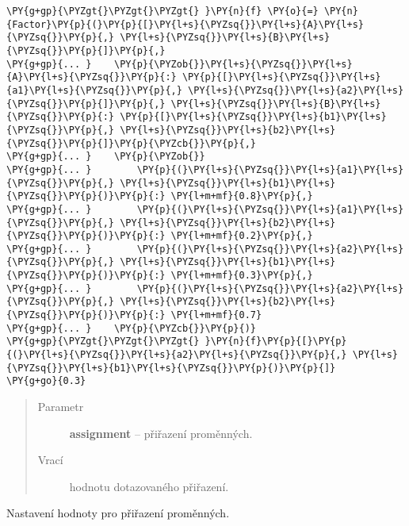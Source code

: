 \begin{fulllineitems}
\begin{fulllineitems}
\begin{Verbatim}[commandchars=\\\{\}]
\PY{g+gp}{\PYZgt{}\PYZgt{}\PYZgt{} }\PY{n}{f} \PY{o}{=} \PY{n}{Factor}\PY{p}{(}\PY{p}{[}\PY{l+s}{\PYZsq{}}\PY{l+s}{A}\PY{l+s}{\PYZsq{}}\PY{p}{,} \PY{l+s}{\PYZsq{}}\PY{l+s}{B}\PY{l+s}{\PYZsq{}}\PY{p}{]}\PY{p}{,}
\PY{g+gp}{... }    \PY{p}{\PYZob{}}\PY{l+s}{\PYZsq{}}\PY{l+s}{A}\PY{l+s}{\PYZsq{}}\PY{p}{:} \PY{p}{[}\PY{l+s}{\PYZsq{}}\PY{l+s}{a1}\PY{l+s}{\PYZsq{}}\PY{p}{,} \PY{l+s}{\PYZsq{}}\PY{l+s}{a2}\PY{l+s}{\PYZsq{}}\PY{p}{]}\PY{p}{,} \PY{l+s}{\PYZsq{}}\PY{l+s}{B}\PY{l+s}{\PYZsq{}}\PY{p}{:} \PY{p}{[}\PY{l+s}{\PYZsq{}}\PY{l+s}{b1}\PY{l+s}{\PYZsq{}}\PY{p}{,} \PY{l+s}{\PYZsq{}}\PY{l+s}{b2}\PY{l+s}{\PYZsq{}}\PY{p}{]}\PY{p}{\PYZcb{}}\PY{p}{,}
\PY{g+gp}{... }    \PY{p}{\PYZob{}}
\PY{g+gp}{... }        \PY{p}{(}\PY{l+s}{\PYZsq{}}\PY{l+s}{a1}\PY{l+s}{\PYZsq{}}\PY{p}{,} \PY{l+s}{\PYZsq{}}\PY{l+s}{b1}\PY{l+s}{\PYZsq{}}\PY{p}{)}\PY{p}{:} \PY{l+m+mf}{0.8}\PY{p}{,}
\PY{g+gp}{... }        \PY{p}{(}\PY{l+s}{\PYZsq{}}\PY{l+s}{a1}\PY{l+s}{\PYZsq{}}\PY{p}{,} \PY{l+s}{\PYZsq{}}\PY{l+s}{b2}\PY{l+s}{\PYZsq{}}\PY{p}{)}\PY{p}{:} \PY{l+m+mf}{0.2}\PY{p}{,}
\PY{g+gp}{... }        \PY{p}{(}\PY{l+s}{\PYZsq{}}\PY{l+s}{a2}\PY{l+s}{\PYZsq{}}\PY{p}{,} \PY{l+s}{\PYZsq{}}\PY{l+s}{b1}\PY{l+s}{\PYZsq{}}\PY{p}{)}\PY{p}{:} \PY{l+m+mf}{0.3}\PY{p}{,}
\PY{g+gp}{... }        \PY{p}{(}\PY{l+s}{\PYZsq{}}\PY{l+s}{a2}\PY{l+s}{\PYZsq{}}\PY{p}{,} \PY{l+s}{\PYZsq{}}\PY{l+s}{b2}\PY{l+s}{\PYZsq{}}\PY{p}{)}\PY{p}{:} \PY{l+m+mf}{0.7}
\PY{g+gp}{... }    \PY{p}{\PYZcb{}}\PY{p}{)}
\PY{g+gp}{\PYZgt{}\PYZgt{}\PYZgt{} }\PY{n}{f}\PY{p}{[}\PY{p}{(}\PY{l+s}{\PYZsq{}}\PY{l+s}{a2}\PY{l+s}{\PYZsq{}}\PY{p}{,} \PY{l+s}{\PYZsq{}}\PY{l+s}{b1}\PY{l+s}{\PYZsq{}}\PY{p}{)}\PY{p}{]}
\PY{g+go}{0.3}
\end{Verbatim}
\begin{quote}\begin{description}
\item[{Parametr}] \leavevmode
\textbf{assignment} -- přiřazení proměnných.

\item[{Vrací}] \leavevmode
hodnotu dotazovaného přiřazení.

\end{description}\end{quote}

\end{fulllineitems}


\begin{fulllineitems}
\label{alex.infer:alex.infer.factor.Factor.__setitem__}
Nastavení hodnoty pro přiřazení proměnných.


\end{fulllineitems}
\end{fulllineitems}
